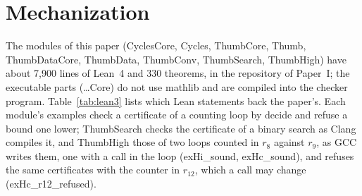 \documentclass[oneside,english]{amsart}
\numberwithin{equation}{section}
\theoremstyle{plain}
\theoremstyle{definition}
\theoremstyle{plain}
\theoremstyle{plain}
\theoremstyle{remark}
\newcommand{\lean}[1]{{\ttfamily\small #1}}
\begin{document}
\section{Mechanization}
\label{sec:mechanization}

The modules of this paper (\lean{CyclesCore}, \lean{Cycles}, \lean{ThumbCore}, \lean{Thumb}, \lean{ThumbDataCore}, \lean{ThumbData}, \lean{ThumbConv}, \lean{ThumbSearch}, \lean{ThumbHigh}) have about 7{,}900 lines of Lean~4 and 330 theorems, in the repository of Paper~I; the executable parts (\lean{\dots Core}) do not use mathlib and are compiled into the checker program. Table~\ref{tab:lean3} lists which Lean statements back the paper's. Each module's examples check a certificate of a counting loop by \lean{decide} and refuse a bound one lower; \lean{ThumbSearch} checks the certificate of a binary search as Clang compiles it, and \lean{ThumbHigh} those of two loops counted in $r_8$ against $r_9$, as GCC writes them, one with a call in the loop (\lean{exHi\_\allowbreak sound}, \lean{exHc\_\allowbreak sound}), and refuses the same certificates with the counter in $r_{12}$, which a call may change (\lean{exHc\_\allowbreak r12\_\allowbreak refused}).
\end{document}
